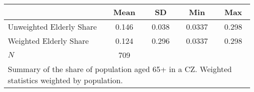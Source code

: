 {
\def\sym#1{\ifmmode^{#1}\else\(^{#1}\)\fi}
\begin{tabular}{l*{1}{cccc}}
\hline\hline
            &        Mean&          SD&         Min&         Max\\
\hline
Unweighted Elderly Share&        0.146&        0.038&       0.0337&        0.298\\
Weighted Elderly Share&        0.124&        0.296&     0.0337&        0.298\\
\hline
\(N\)       &         709&            &            &            \\
\hline\hline
\multicolumn{5}{p{0.55\textwidth}}{Summary of the share of population aged 65+ in a CZ\@.  Weighted statistics weighted by population.}
\end{tabular}
}
